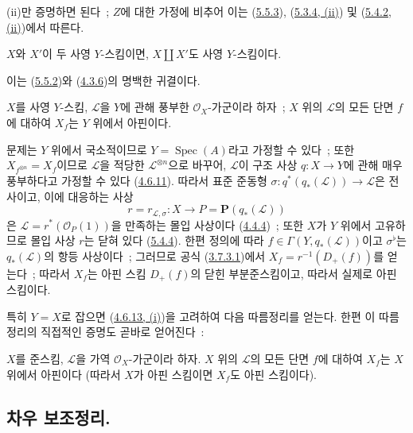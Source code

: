 (ii)만 증명하면 된다~; $Z$에 대한 가정에 비추어 이는
(\hyperref[II.5.5.3-ko]{5.5.3}),
(\hyperref[II.5.3.4-ko]{5.3.4, (ii)}) 및
(\hyperref[II.5.4.2-ko]{5.4.2, (ii)})에서 따른다.

\begin{proposition}[5.5.6]
\label{II.5.5.6-ko}
$X$와 $X'$이 두 사영 $Y$-스킴이면, $X\amalg X'$도 사영
$Y$-스킴이다.
\end{proposition}

이는 (\hyperref[II.5.5.2-ko]{5.5.2})와
(\hyperref[II.4.3.6-ko]{4.3.6})의 명백한 귀결이다.

\begin{proposition}[5.5.7]
\label{II.5.5.7-ko}
$X$를 사영 $Y$-스킴, $\mathcal{L}$을 $Y$에 관해 풍부한
$\mathcal{O}_X$-가군이라 하자~; $X$ 위의 $\mathcal{L}$의 모든 단면
$f$에 대하여 $X_f$는 $Y$ 위에서 아핀이다.
\end{proposition}


문제는 $Y$ 위에서 국소적이므로 $Y=\operatorname{Spec}(A)$라고 가정할
수 있다~; 또한 $X_{f^{\otimes n}}=X_f$이므로 $\mathcal{L}$을 적당한
$\mathcal{L}^{\otimes n}$으로 바꾸어, $\mathcal{L}$이 구조 사상
$q:X\to Y$에 관해 매우 풍부하다고 가정할 수 있다
(\hyperref[II.4.6.11-ko]{4.6.11}). 따라서 표준 준동형
$\sigma:q^*(q_*(\mathcal{L}))\to\mathcal{L}$은 전사이고, 이에 대응하는
사상
\[
r=r_{\mathcal{L},\sigma}:X\to P=\mathbf{P}(q_*(\mathcal{L}))
\]
은 $\mathcal{L}=r^*(\mathcal{O}_P(1))$을 만족하는 몰입 사상이다
(\hyperref[II.4.4.4-ko]{4.4.4})~; 또한 $X$가 $Y$ 위에서 고유하므로
몰입 사상 $r$는 닫혀 있다 (\hyperref[II.5.4.4-ko]{5.4.4}). 한편
정의에 따라 $f\in\Gamma(Y,q_*(\mathcal{L}))$이고
$\sigma^\flat$는 $q_*(\mathcal{L})$의 항등 사상이다~; 그러므로 공식
(\hyperref[II.3.7.3.1-ko]{3.7.3.1})에서
$X_f=r^{-1}(D_+(f))$를 얻는다~; 따라서 $X_f$는 아핀 스킴
$D_+(f)$의 닫힌 부분준스킴이고, 따라서 실제로 아핀 스킴이다.

특히 $Y=X$로 잡으면 (\hyperref[II.4.6.13-ko]{4.6.13, (i)})을
고려하여 다음 따름정리를 얻는다. 한편 이 따름정리의 직접적인 증명도
곧바로 얻어진다~:

\begin{corollary}[5.5.8]
\label{II.5.5.8-ko}
$X$를 준스킴, $\mathcal{L}$을 가역 $\mathcal{O}_X$-가군이라 하자.
$X$ 위의 $\mathcal{L}$의 모든 단면 $f$에 대하여 $X_f$는 $X$ 위에서
아핀이다 (따라서 $X$가 아핀 스킴이면 $X_f$도 아핀 스킴이다).
\end{corollary}

\subsection{차우 보조정리.}
\label{subsection:II.5.6-ko}

